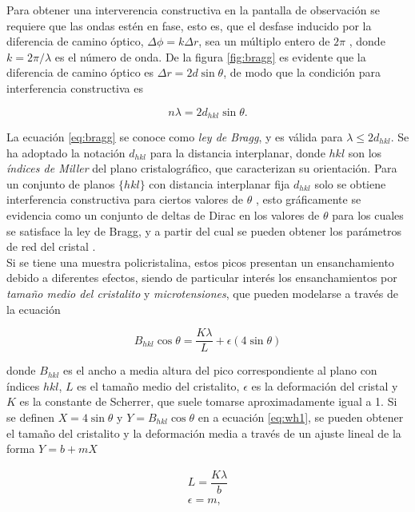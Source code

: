 \documentclass[final,5p,times,twocolumn, nopreprintline]{elsarticle}
\numberwithin{equation}{section}
\begin{document}
Para obtener una interverencia constructiva en la pantalla de observación se requiere que las ondas estén en fase, esto es, que el desfase inducido por la diferencia de camino óptico, $\Delta\phi=k\Delta r$, sea un múltiplo entero de $2\pi$ \cite{hecht2012optics}, donde $k=2\pi/\lambda$ es el número de onda. De la figura \ref{fig:bragg} es evidente que la diferencia de camino óptico es $\Delta r = 2d\sin\theta$, de modo que la condición para interferencia constructiva es

\begin{equation}
n\lambda = 2d_{hkl}\sin\theta. \label{eq:bragg}
\end{equation}

La ecuación \ref{eq:bragg} se conoce como \emph{ley de Bragg}, y es válida para $\lambda\leq 2d_{hkl}$. Se ha adoptado la notación $d_{hkl}$ para la distancia interplanar, donde $hkl$ son los \emph{índices de Miller} del plano cristalográfico, que caracterizan su orientación. Para un conjunto de planos $\{hkl\}$ con distancia interplanar fija $d_{hkl}$ solo se obtiene interferencia constructiva para ciertos valores de $\theta$ \cite{kittel2018introduction}, esto gráficamente se evidencia como un conjunto de deltas de Dirac en los valores de $\theta$ para los cuales se satisface la ley de Bragg, y a partir del cual se pueden obtener los parámetros de red del cristal \cite{ds1989simple}.\\

Si se tiene una muestra policristalina, estos picos presentan un ensanchamiento debido a diferentes efectos, siendo de particular interés los ensanchamientos por \emph{tamaño medio del cristalito} y \emph{microtensiones}, que pueden modelarse a través de la ecuación

\begin{equation}
B_{hkl}\cos\theta=\dfrac{K\lambda}{L}+\epsilon(4\sin\theta) \label{eq:wh1}
\end{equation}

donde $B_{hkl}$ es el ancho a media altura del pico correspondiente al plano con índices $hkl$, $L$ es el tamaño medio del cristalito, $\epsilon$ es la deformación del cristal y $K$ es la constante de Scherrer, que suele tomarse aproximadamente igual a 1. Si se definen $X=4\sin\theta$ y $Y=B_{hkl}\cos\theta$ en a ecuación \ref{eq:wh1}, se pueden obtener el tamaño del cristalito y la deformación media a través de un ajuste lineal de la forma $Y=b+mX$

\begin{align}
L=\dfrac{K\lambda}{b}\\
\epsilon=m,
\end{align} \label{eq:wh2}
\end{document}
